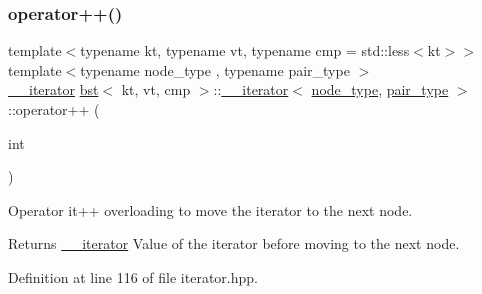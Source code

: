 \mbox{\label{classbst_1_1____iterator_a0a43380fa33e82342236ef747a5e72e2}} 
\subsubsection{\texorpdfstring{operator++()}{operator++()}\hspace{0.1cm}{\footnotesize\ttfamily [2/2]}}
{\footnotesize\ttfamily template$<$typename kt, typename vt, typename cmp = std\+::less$<$kt$>$$>$ \\
template$<$typename node\+\_\+type , typename pair\+\_\+type $>$ \\
\hyperlink{classbst_1_1____iterator}{\+\_\+\+\_\+iterator} \hyperlink{classbst}{bst}$<$ kt, vt, cmp $>$\+::\hyperlink{classbst_1_1____iterator}{\+\_\+\+\_\+iterator}$<$ \hyperlink{classbst_a062eb2a1ac54802dbc4f0f74ae2afd01}{node\+\_\+type}, \hyperlink{classbst_a7b11cca2a3b4394915600194f741ab16}{pair\+\_\+type} $>$\+::operator++ (\begin{DoxyParamCaption}\item[{int}]{ }\end{DoxyParamCaption})\hspace{0.3cm}{\ttfamily [inline]}}



Operator it++ overloading to move the iterator to the next node. 

\begin{DoxyReturn}{Returns}
\hyperlink{classbst_1_1____iterator}{\+\_\+\+\_\+iterator} Value of the iterator before moving to the next node. 
\end{DoxyReturn}


Definition at line 116 of file iterator.\+hpp.

\mbox{\label{classbst_1_1____iterator_a66e7536009f3948f71f6cbdffe5fd337}} 
